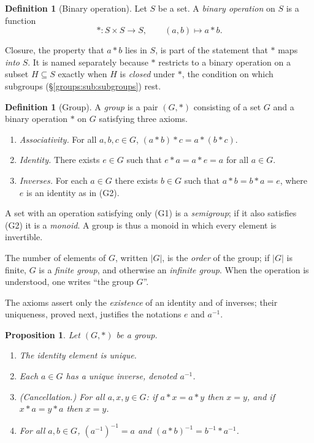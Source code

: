 \documentclass[11pt,a4paper]{article}
\newtheorem{proposition}[theorem]{Proposition}
\theoremstyle{definition}
\newtheorem{definition}[theorem]{Definition}
\theoremstyle{remark}
\providecommand{\abs}[1]{\lvert #1 \rvert}
\begin{document}
\begin{definition}[Binary operation]\label{groups:def-binop}
Let \(S\) be a set. A \emph{binary operation} on \(S\) is a function
\[
\ast \colon S \times S \to S, \qquad (a,b) \mapsto a \ast b .
\]
\end{definition}

Closure, the property that \(a \ast b\) lies in \(S\), is part of the
statement that \(\ast\) maps \emph{into} \(S\). It is named separately
because \(\ast\) restricts to a binary operation on a subset
\(H \subseteq S\) exactly when \(H\) is \emph{closed} under \(\ast\), the
condition on which subgroups (\S\ref{groups:sub:subgroups}) rest.

\begin{definition}[Group]\label{groups:def-group}
A \emph{group} is a pair \((G,\ast)\) consisting of a set \(G\) and a
binary operation \(\ast\) on \(G\) satisfying three axioms.
\begin{enumerate}
\item[(G1)] \emph{Associativity.} For all \(a,b,c \in G\),
  \((a \ast b) \ast c = a \ast (b \ast c)\).
\item[(G2)] \emph{Identity.} There exists \(e \in G\) such that
  \(e \ast a = a \ast e = a\) for all \(a \in G\).
\item[(G3)] \emph{Inverses.} For each \(a \in G\) there exists
  \(b \in G\) such that \(a \ast b = b \ast a = e\), where \(e\) is an
  identity as in (G2).
\end{enumerate}
A set with an operation satisfying only (G1) is a \emph{semigroup}; if it
also satisfies (G2) it is a \emph{monoid}. A group is thus a monoid in
which every element is invertible.
\end{definition}

The number of elements of \(G\), written \(\abs{G}\), is the \emph{order}
of the group; if \(\abs{G}\) is finite, \(G\) is a \emph{finite group},
and otherwise an \emph{infinite group}. When the operation is understood,
one writes ``the group \(G\)''.

The axioms assert only the \emph{existence} of an identity and of inverses;
their uniqueness, proved next, justifies the notations \(e\) and \(a^{-1}\).

\begin{proposition}\label{groups:prop-unique-id-inv}
Let \((G,\ast)\) be a group.
\begin{enumerate}
\item The identity element is unique.
\item Each \(a \in G\) has a unique inverse, denoted \(a^{-1}\).
\item \textup{(Cancellation.)} For all \(a,x,y \in G\): if
  \(a \ast x = a \ast y\) then \(x = y\), and if \(x \ast a = y \ast a\)
  then \(x = y\).
\item For all \(a,b \in G\), \((a^{-1})^{-1} = a\) and
  \((a \ast b)^{-1} = b^{-1} \ast a^{-1}\).
\end{enumerate}
\end{proposition}
\end{document}

